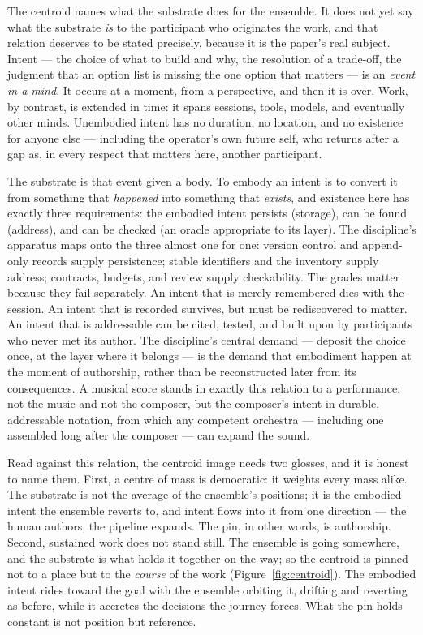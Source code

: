 \documentclass[11pt,a4paper,twocolumn]{article}
\begin{document}
The centroid names what the substrate does for the ensemble. It
does not yet say what the substrate \emph{is} to the participant
who originates the work, and that relation deserves to be stated
precisely, because it is the paper's real subject. Intent --- the
choice of what to build and why, the resolution of a trade-off,
the judgment that an option list is missing the one option that
matters --- is an \emph{event in a mind}. It occurs at a moment,
from a perspective, and then it is over. Work, by contrast, is
extended in time: it spans sessions, tools, models, and eventually
other minds. Unembodied intent has no duration, no location, and
no existence for anyone else --- including the operator's own
future self, who returns after a gap as, in every respect that
matters here, another participant.

The substrate is that event given a body. To embody an intent is
to convert it from something that \emph{happened} into something
that \emph{exists}, and existence here has exactly three
requirements: the embodied intent persists (storage), can be found
(address), and can be checked (an oracle appropriate to its
layer). The discipline's apparatus maps onto the three almost one
for one: version control and append-only records supply
persistence; stable identifiers and the inventory supply address;
contracts, budgets, and review supply checkability. The grades
matter because they fail separately. An intent that is merely
remembered dies with the session. An intent that is recorded
survives, but must be rediscovered to matter. An intent that is
addressable can be cited, tested, and built upon by participants
who never met its author. The discipline's central demand ---
deposit the choice once, at the layer where it belongs --- is the
demand that embodiment happen at the moment of authorship, rather
than be reconstructed later from its consequences. A musical score
stands in exactly this relation to a performance: not the music
and not the composer, but the composer's intent in durable,
addressable notation, from which any competent orchestra ---
including one assembled long after the composer --- can expand the
sound.

Read against this relation, the centroid image needs two glosses,
and it is honest to name them. First, a centre of mass is
democratic: it weights every mass alike. The substrate is not the
average of the ensemble's positions; it is the embodied intent the
ensemble reverts to, and intent flows into it from one direction
--- the human authors, the pipeline expands. The pin, in other
words, is authorship. Second, sustained work does not stand still.
The ensemble is going somewhere, and the substrate is what holds
it together on the way; so the centroid is pinned not to a place
but to the \emph{course} of the work
(Figure~\ref{fig:centroid}). The embodied intent rides toward the
goal with the ensemble orbiting it, drifting and reverting as
before, while it accretes the decisions the journey forces. What
the pin holds constant is not position but reference.
\end{document}
